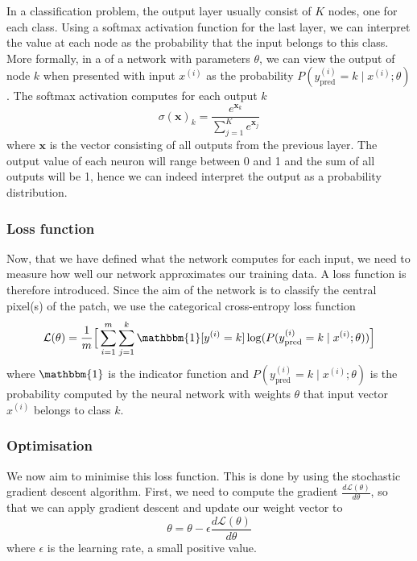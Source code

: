 \documentclass[12pt,a4paper,twoside,openright]{report}
\begin{document}
In a classification problem, the output layer usually consist of $K$ nodes, one for each class. Using a softmax activation function for the last layer, we can interpret the value at each node as the probability that the input belongs to this class.  More formally, in a of a network with parameters $\theta$, we can view the output of node $k$ when presented with input $x^{(i)}$ as the probability $P(y_{\text{pred}}^{(i)} = k \mid x^{(i)};\theta)$. The softmax activation computes for each output $k$
\begin{equation}
	\sigma(\mathbf{x})_k = \frac{e^{\mathbf{x}_k}}{\sum_{j=1}^{K}e^{\mathbf{x}_j}}
\end{equation}
where $\mathbf{x}$ is the vector consisting of all outputs from the previous layer. The output value of each neuron will range between 0 and 1 and the sum of all outputs will be 1, hence we can indeed interpret the output as a probability distribution.

\subsubsection{Loss function}
Now, that we have defined what the network computes for each input, we need to measure how well our network approximates our training data. A loss function is therefore introduced. Since the aim of the network is to classify the central pixel(s) of the patch, we use the categorical cross-entropy loss function
\begin{equation}
	\label{eq:loss}
	\mathcal{L}(\theta) = 
	\frac{1}{m}\Big[\sum_{i=1}^m \sum_{j=1}^k\mathbbm{1}[y^{(i)} = k]\log(P(y_{\text{pred}}^{(i)}=k \mid x^{(i)};\theta))\Big]
\end{equation}
where $\mathbbm{1}$ is the indicator function and $P(y_{\text{pred}}^{(i)}=k \mid x^{(i)};\theta)$ is the probability computed by the neural network with weights $\theta$ that input vector $x^{(i)}$ belongs to class $k$.

\subsubsection{Optimisation}
We now aim to minimise this loss function. This is done by using the stochastic gradient descent algorithm. First, we need to compute the gradient $\frac{d\mathcal{L}(\theta)}{d\theta}$, so that we can apply gradient descent and update our weight vector to
\begin{equation}
	\theta = \theta - \epsilon \frac{d\mathcal{L}(\theta)}{d\theta}
\end{equation}
where $\epsilon$ is the learning rate, a small positive value.
\end{document}
